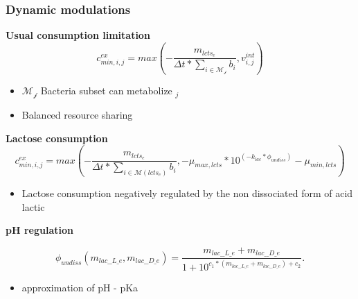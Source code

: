 \documentclass[8pt]{beamer}
\begin{document}
\begin{frame}
\frametitle{Dynamic modulations}

\textbf{Usual consumption limitation}
\begin{equation}
c^{ex}_{min,i,j} = max(-\frac{m_{lcts_e}}{\Delta t*\sum_{i \in \mathcal{M_j}} b_i}, v^{int}_{i,j})
\end{equation}

\begin{block}{}
\begin{itemize}
\item $\mathcal{M_j}$ Bacteria subset can metabolize $_j$
\item Balanced resource sharing 
\end{itemize}

\end{block}

\textbf{Lactose consumption}
\begin{equation}
c^{ex}_{min,i,j} = max(-\frac{m_{lcts_e}}{\Delta t*\sum_{i \in \mathcal{M}(lcts_e)} b_i},-\mu_{max,lcts}*10^{(-k_{lac}*\phi_{undiss})}-\mu_{min,lcts})
\end{equation}
\begin{block}{}
\begin{itemize}
\item Lactose consumption negatively regulated by the non dissociated form of acid lactic
\end{itemize}
\end{block}


\textbf{pH regulation}


\begin{equation}
\phi_{undiss}(m_{lac\_\_L\_e},m_{lac\_\_D\_e}) = \frac{m_{lac\_\_L\_e}+m_{lac\_\_D\_e}}{1+ 10^{c_1 * (m_{lac\_\_L\_e}+m_{lac\_\_D\_e})+c_2}}.
\label{eq:undissociated-lactate}
\end{equation}

\begin{block}{}
\begin{itemize}
\item approximation of pH - pKa
\end{itemize}
\end{block}
\end{frame}
\end{document}
